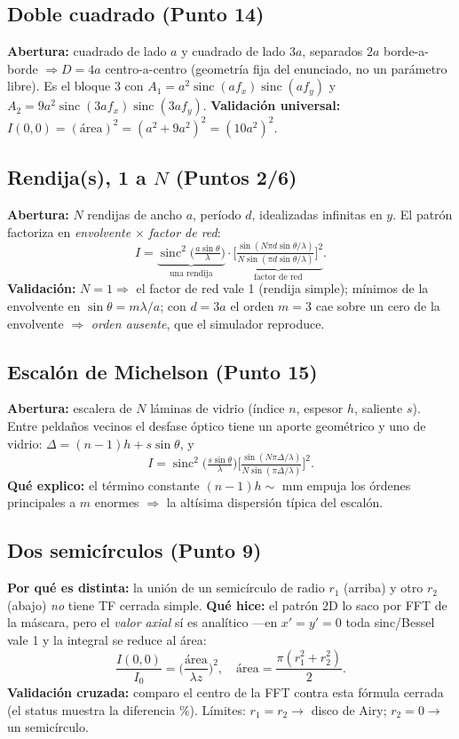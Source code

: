\documentclass[11pt,a4paper]{article}
\newcommand{\sinc}{\operatorname{sinc}}
\begin{document}
\subsection{Doble cuadrado (Punto 14)}
\textbf{Abertura:} cuadrado de lado $a$ y cuadrado de lado $3a$, separados $2a$
borde-a-borde $\Rightarrow D=4a$ centro-a-centro (geometría fija del enunciado, no
un parámetro libre). Es el bloque 3 con
$A_1=a^2\sinc(af_x)\sinc(af_y)$ y $A_2=9a^2\sinc(3af_x)\sinc(3af_y)$.
\textbf{Validación universal:} $I(0,0)=(\text{área})^2=(a^2+9a^2)^2=(10a^2)^2$.

\subsection{Rendija(s), 1 a $N$ (Puntos 2/6)}
\textbf{Abertura:} $N$ rendijas de ancho $a$, período $d$, idealizadas infinitas en
$y$. El patrón factoriza en \emph{envolvente} $\times$ \emph{factor de red}:
\[
I=\underbrace{\sinc^2\!\Big(\tfrac{a\sin\theta}{\lambda}\Big)}_{\text{una rendija}}
\cdot
\underbrace{\Big[\tfrac{\sin(N\pi d\sin\theta/\lambda)}{N\sin(\pi d\sin\theta/\lambda)}\Big]^2}_{\text{factor de red}} .
\]
\textbf{Validación:} $N=1\Rightarrow$ el factor de red vale 1 (rendija simple);
mínimos de la envolvente en $\sin\theta=m\lambda/a$; con $d=3a$ el orden $m=3$ cae
sobre un cero de la envolvente $\Rightarrow$ \emph{orden ausente}, que el simulador
reproduce.

\subsection{Escalón de Michelson (Punto 15)}
\textbf{Abertura:} escalera de $N$ láminas de vidrio (índice $n$, espesor $h$,
saliente $s$). Entre peldaños vecinos el desfase óptico tiene un aporte geométrico
y uno de vidrio: $\Delta=(n-1)h+s\sin\theta$, y
\[
I=\sinc^2\!\Big(\tfrac{s\sin\theta}{\lambda}\Big)
\Big[\tfrac{\sin(N\pi\Delta/\lambda)}{N\sin(\pi\Delta/\lambda)}\Big]^2 .
\]
\textbf{Qué explico:} el término constante $(n-1)h\sim$ mm empuja los órdenes
principales a $m$ enormes $\Rightarrow$ la altísima dispersión típica del escalón.

\subsection{Dos semicírculos (Punto 9)}
\textbf{Por qué es distinta:} la unión de un semicírculo de radio $r_1$ (arriba) y
otro $r_2$ (abajo) \emph{no} tiene TF cerrada simple. \textbf{Qué hice:} el patrón
2D lo saco por FFT de la máscara, pero el \emph{valor axial} sí es analítico ---en
$x'=y'=0$ toda sinc/Bessel vale 1 y la integral se reduce al área:
\[
\frac{I(0,0)}{I_0}=\Big(\frac{\text{área}}{\lambda z}\Big)^2,\quad
\text{área}=\frac{\pi(r_1^2+r_2^2)}{2}.
\]
\textbf{Validación cruzada:} comparo el centro de la FFT contra esta fórmula
cerrada (el status muestra la diferencia \%). Límites: $r_1=r_2\to$ disco de Airy;
$r_2=0\to$ un semicírculo.
\end{document}
